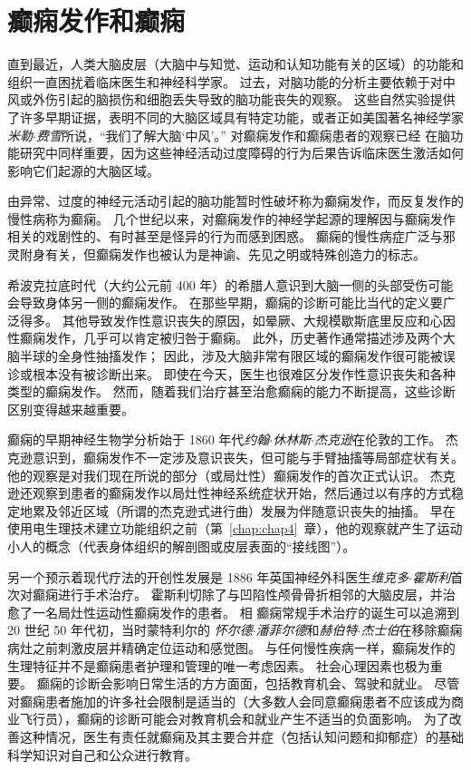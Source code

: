 \chapter{癫痫发作和癫痫} \label{chap:chap58}

直到最近，人类大脑皮层（大脑中与知觉、运动和认知功能有关的区域）的功能和组织一直困扰着临床医生和神经科学家。
过去，对脑功能的分析主要依赖于对中风或外伤引起的脑损伤和细胞丢失导致的脑功能丧失的观察。
这些自然实验提供了许多早期证据，表明不同的大脑区域具有特定功能，或者正如美国著名神经学家\textit{米勒$\cdot$费雪}所说，“我们了解大脑‘中风’。”
对癫痫发作和癫痫患者的观察已经 在脑功能研究中同样重要，因为这些神经活动过度障碍的行为后果告诉临床医生激活如何影响它们起源的大脑区域。


由异常、过度的神经元活动引起的脑功能暂时性破坏称为癫痫发作，而反复发作的慢性病称为癫痫。
几个世纪以来，对癫痫发作的神经学起源的理解因与癫痫发作相关的戏剧性的、有时甚至是怪异的行为而感到困惑。
癫痫的慢性病症广泛与邪灵附身有关，但癫痫发作也被认为是神谕、先见之明或特殊创造力的标志。


希波克拉底时代（大约公元前 400 年）的希腊人意识到大脑一侧的头部受伤可能会导致身体另一侧的癫痫发作。
在那些早期，癫痫的诊断可能比当代的定义要广泛得多。
其他导致发作性意识丧失的原因，如晕厥、大规模歇斯底里反应和心因性癫痫发作，几乎可以肯定被归咎于癫痫。
此外，历史著作通常描述涉及两个大脑半球的全身性抽搐发作；
因此，涉及大脑非常有限区域的癫痫发作很可能被误诊或根本没有被诊断出来。
即使在今天，医生也很难区分发作性意识丧失和各种类型的癫痫发作。
然而，随着我们治疗甚至治愈癫痫的能力不断提高，这些诊断区别变得越来越重要。


癫痫的早期神经生物学分析始于 1860 年代\textit{约翰$\cdot$休林斯$\cdot$杰克逊}在伦敦的工作。
杰克逊意识到，癫痫发作不一定涉及意识丧失，但可能与手臂抽搐等局部症状有关。
他的观察是对我们现在所说的部分（或局灶性）癫痫发作的首次正式认识。
杰克逊还观察到患者的癫痫发作以局灶性神经系统症状开始，然后通过以有序的方式稳定地累及邻近区域（所谓的杰克逊式进行曲）发展为伴随意识丧失的抽搐。
早在使用电生理技术建立功能组织之前（第~\ref{chap:chap4}~章），他的观察就产生了运动小人的概念（代表身体组织的解剖图或皮层表面的“接线图”）。


另一个预示着现代疗法的开创性发展是 1886 年英国神经外科医生\textit{维克多$\cdot$霍斯利}首次对癫痫进行手术治疗。
霍斯利切除了与凹陷性颅骨骨折相邻的大脑皮层，并治愈了一名局灶性运动性癫痫发作的患者。
相 癫痫常规手术治疗的诞生可以追溯到 20 世纪 50 年代初，当时蒙特利尔的 \textit{怀尔德$\cdot$潘菲尔德}和\textit{赫伯特$\cdot$杰士伯}在移除癫痫病灶之前刺激皮层并精确定位运动和感觉图。
与任何慢性疾病一样，癫痫发作的生理特征并不是癫痫患者护理和管理的唯一考虑因素。
社会心理因素也极为重要。
癫痫的诊断会影响日常生活的方方面面，包括教育机会、驾驶和就业。
尽管对癫痫患者施加的许多社会限制是适当的（大多数人会同意癫痫患者不应该成为商业飞行员），癫痫的诊断可能会对教育机会和就业产生不适当的负面影响。
为了改善这种情况，医生有责任就癫痫及其主要合并症（包括认知问题和抑郁症）的基础科学知识对自己和公众进行教育。



